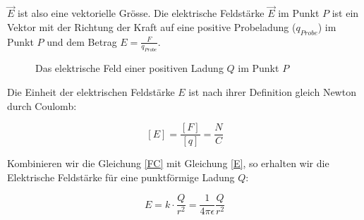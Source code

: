 \documentclass[11pt,twoside=false,open=any]{scrbook}
\begin{document}
\begin{center}
   \setlength{\fboxrule}{2pt}
\end{center}



$\vec{E}$ ist also eine vektorielle Grösse. Die elektrische Feldstärke  $\vec{E}$ im Punkt $P$ ist ein Vektor mit der Richtung der Kraft auf eine positive Probeladung ($q_{Probe}$) im Punkt $P$ und dem Betrag $E = \frac{F}{q_{Probe}}$.


\begin{figure}[h]
\begin{center}
\caption{Das elektrische Feld einer positiven Ladung $Q$ im Punkt $P$}
\label{Eprobe}
\end{center}
\end{figure}

Die Einheit der elektrischen Feldstärke $E$ ist nach ihrer Definition gleich Newton durch Coulomb:

\begin{equation}
\left[ E \right] = \frac{\left[ F \right]}{\left[ q \right]} = \frac{N}{C}
\label{DE}
\end{equation}

Kombinieren wir die Gleichung \ref{FC} mit Gleichung \ref{E}, so erhalten wir die Elektrische Feldstärke für eine punktförmige Ladung $Q$:

\begin{equation}
E = k \cdot \frac{ Q}{r^{2}} = \frac{1}{4 \pi \epsilon} \frac{Q}{r^2}
\label{E2}
\end{equation}
\end{document}
